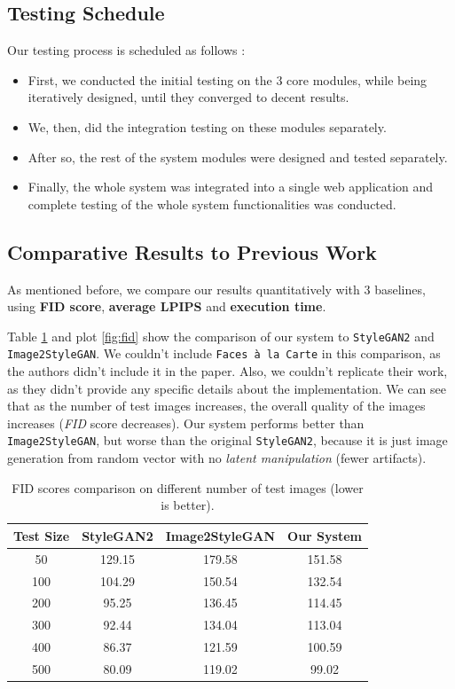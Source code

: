 \subsection{Testing Schedule}
Our testing process is scheduled as follows :
\begin{itemize}
    \item First, we conducted the initial testing on the $3$ core modules, while being iteratively designed, until they converged to decent results.
    \item We, then, did the integration testing on these modules separately.
    \item After so, the rest of the system modules were designed and tested separately.
    \item Finally, the whole system was integrated into a single web application and complete testing of the whole system functionalities was conducted.
\end{itemize}

\subsection{Comparative Results to Previous Work}
As mentioned before, we compare our results quantitatively with $3$ baselines, using \textbf{FID score}, \textbf{average LPIPS} and \textbf{execution time}.

Table \ref{tab:fid} and plot \ref{fig:fid} show the comparison of our system to \texttt{StyleGAN2} and \texttt{Image2StyleGAN}. We couldn't include \texttt{Faces à la Carte} in this comparison, as the authors didn't include it in the paper. Also, we couldn't replicate their work, as they didn't provide any specific details about the implementation. We can see that as the number of test images increases, the overall quality of the images increases (\emph{FID} score decreases). Our system performs better than \texttt{Image2StyleGAN}, but worse than the original \texttt{StyleGAN2}, because it is just image generation from random vector with no \emph{latent manipulation} (fewer artifacts).

\begin{table}[ht]
\centering
\begin{tabular}[t]{| c | c | c | c |}
\hline
Test Size & StyleGAN2 & Image2StyleGAN & Our System \\
\hline
50 & 129.15 & 179.58 & 151.58 \\
\hline
100 & 104.29 & 150.54 & 132.54 \\
\hline
200 & 95.25 & 136.45 & 114.45 \\
\hline
300 & 92.44 & 134.04 & 113.04 \\
\hline
400 & 86.37 & 121.59 & 100.59 \\
\hline
500 & 80.09 & 119.02 & 99.02 \\
\hline
\end{tabular}
\caption{FID scores comparison on different number of test images (lower is better).}
\label{tab:fid}
\end{table}

